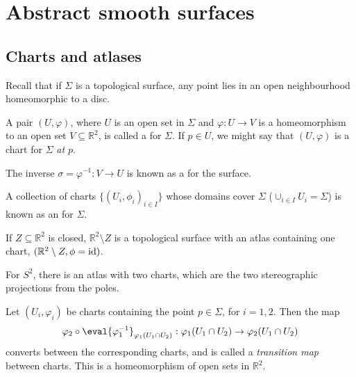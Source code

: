 \section{Abstract smooth surfaces}

\subsection{Charts and atlases}
Recall that if $\Sigma$ is a topological surface, any point lies in an open neighbourhood homeomorphic to a disc.

\begin{definition}[Chart]
	A pair $(U, \varphi)$, where $U$ is an open set in $\Sigma$ and $\varphi \colon U \to V$ is a homeomorphism to an open set $V \subseteq \mathbb R^2$, is called a  for $\Sigma$.
	If $p \in U$, we might say that $(U, \varphi)$ is a chart for $\Sigma$ \textit{at $p$}.
\end{definition}

\begin{definition}
	The inverse $\sigma = \varphi^{-1} \colon V \to U$ is known as a  for the surface.
\end{definition} 

\begin{definition}[Atlas]
	A collection of charts $\{ (U_i, \phi_i)_{i \in I}\}$ whose domains cover $\Sigma$ ($\cup_{i \in I} U_i = \Sigma$) is known as an  for $\Sigma$.
\end{definition} 

\begin{example}
	If $Z \subseteq \mathbb R^2$ is closed, $\mathbb R^2 \setminus Z$ is a topological surface with an atlas containing one chart, $(\mathbb R^2 \setminus Z, \phi = \operatorname{id})$.
\end{example}

\begin{example}
	For $S^2$, there is an atlas with two charts, which are the two stereographic projections from the poles.
\end{example} 

\begin{definition}
	Let $(U_i, \varphi_i)$ be charts containing the point $p \in \Sigma$, for $i = 1, 2$.
	Then the map
	\begin{align*}
		\varphi_2 \circ \eval{\varphi_1^{-1}}_{\varphi_1(U_1 \cap U_2)} : \varphi_1(U_1 \cap U_2) \to \varphi_2(U_1 \cap U_2)
	\end{align*}
	converts between the corresponding charts, and is called a \textit{transition map} between charts.
	This is a homeomorphism of open sets in $\mathbb R^2$.
\end{definition}

